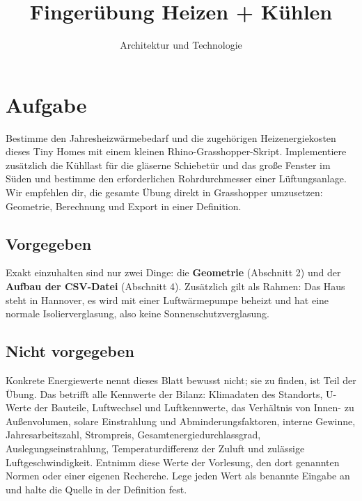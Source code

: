 \title{Fingerübung Heizen + Kühlen}
\author{Architektur und Technologie}
\date{}
\newcommand{\EnergyDecimal}{{,}}
\newcommand{\EnergyWordElement}{Element}
\newcommand{\EnergyWordEnvelope}{Gebäudehülle}
\newcommand{\EnergyWordFloor}{Nutzfläche}
\newcommand{\EnergyWordWindowSouth}{Fenster Süd}
\newcommand{\EnergyWordDoorEast}{Schiebetür Ost}
\newcommand{\EnergyWordAxonometry}{Axonometrie}
\newcommand{\EnergyWordCoordinates}{Koordinaten in Metern}
\newcommand{\EnergyWordCsvExample}{Aufbau der Zeilen}
\newcommand{\EnergyWordCsvRows}{Zeilen der Vorlage}
\newcommand{\EnergyWordCanopy}{Vordach}

\makeassignmentcover
\section{Aufgabe}
Bestimme den Jahresheizwärmebedarf und die zugehörigen Heizenergiekosten dieses Tiny Homes mit einem kleinen Rhino-Grasshopper-Skript. Implementiere zusätzlich die Kühllast für die gläserne Schiebetür und das große Fenster im Süden und bestimme den erforderlichen Rohrdurchmesser einer Lüftungsanlage. Wir empfehlen dir, die gesamte Übung direkt in Grasshopper umzusetzen: Geometrie, Berechnung und Export in einer Definition.

\subsection{Vorgegeben}
Exakt einzuhalten sind nur zwei Dinge: die \textbf{Geometrie} (Abschnitt 2) und der \textbf{Aufbau der CSV-Datei} (Abschnitt 4). Zusätzlich gilt als Rahmen: Das Haus steht in Hannover, es wird mit einer Luftwärmepumpe beheizt und hat eine normale Isolierverglasung, also keine Sonnenschutzverglasung.

\subsection{Nicht vorgegeben}
Konkrete Energiewerte nennt dieses Blatt bewusst nicht; sie zu finden, ist Teil der Übung. Das betrifft alle Kennwerte der Bilanz: Klimadaten des Standorts, U-Werte der Bauteile, Luftwechsel und Luftkennwerte, das Verhältnis von Innen- zu Außenvolumen, solare Einstrahlung und Abminderungsfaktoren, interne Gewinne, Jahresarbeitszahl, Strompreis, Gesamtenergiedurchlassgrad, Auslegungseinstrahlung, Temperaturdifferenz der Zuluft und zulässige Luftgeschwindigkeit. Entnimm diese Werte der Vorlesung, den dort genannten Normen oder einer eigenen Recherche. Lege jeden Wert als benannte Eingabe an und halte die Quelle in der Definition fest.
